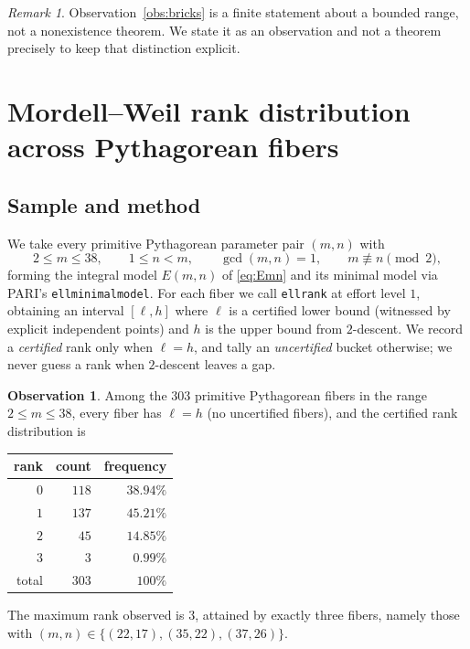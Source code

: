 \documentclass[11pt,reqno]{amsart}
\theoremstyle{plain}
\theoremstyle{definition}
\newtheorem{observation}[theorem]{Observation}
\theoremstyle{remark}
\newtheorem{remark}[theorem]{Remark}
\begin{document}
\begin{remark}
Observation~\ref{obs:bricks} is a finite statement about a bounded range, not a
nonexistence theorem. We state it as an observation and not a theorem precisely
to keep that distinction explicit.
\end{remark}

\section{Mordell--Weil rank distribution across Pythagorean fibers}\label{sec:dist}

\subsection*{Sample and method}
We take every primitive Pythagorean parameter pair $(m,n)$ with
\[
  2\le m\le 38,\qquad 1\le n<m,\qquad \gcd(m,n)=1,\qquad m\not\equiv n \pmod 2,
\]
forming the integral model $E(m,n)$ of \eqref{eq:Emn} and its minimal model via
PARI's \texttt{ellminimalmodel}. For each fiber we call \texttt{ellrank} at
effort level $1$, obtaining an interval $[\ell,h]$ where $\ell$ is a certified
lower bound (witnessed by explicit independent points) and $h$ is the upper
bound from $2$-descent. We record a \emph{certified} rank only when
$\ell=h$, and tally an \emph{uncertified} bucket otherwise; we never guess a
rank when $2$-descent leaves a gap.

\begin{observation}\label{obs:dist}
Among the $303$ primitive Pythagorean fibers in the range $2\le m\le 38$, every
fiber has $\ell=h$ (no uncertified fibers), and the certified rank distribution
is
\begin{center}
\begin{tabular}{rrr}
\toprule
rank & count & frequency \\
\midrule
$0$ & $118$ & $38.94\%$ \\
$1$ & $137$ & $45.21\%$ \\
$2$ & $45$ & $14.85\%$ \\
$3$ & $3$ & $0.99\%$ \\
\midrule
total & $303$ & $100\%$ \\
\bottomrule
\end{tabular}
\end{center}
The maximum rank observed is $3$, attained by exactly three fibers, namely
those with $(m,n)\in\{(22,17),(35,22),(37,26)\}$.
\end{observation}
\end{document}
